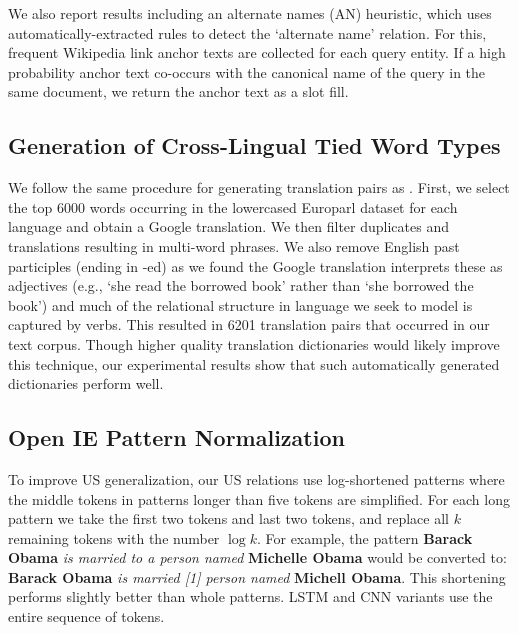 We also report results including an alternate names (AN) heuristic, which uses automatically-extracted rules to detect the `alternate name' relation.
For this, frequent Wikipedia link anchor texts are collected for each query entity.
If a high probability anchor text co-occurs with the canonical name of the query in the same document, we return the anchor text as a slot fill.

\subsection{Generation of Cross-Lingual Tied Word Types}
\label{sec:word-tying}
We follow the same procedure for generating translation pairs as \cite{mikolov2013}. First, we select the top 6000 words occurring in the lowercased Europarl dataset for each language and obtain a Google translation. We then filter duplicates and translations resulting in multi-word phrases. We also remove English past participles (ending in -ed) as we found the Google translation interprets these as adjectives (e.g.,  `she read the borrowed book' rather than `she borrowed the book') and much of the relational structure in language we seek to model is captured by verbs. This resulted in 6201 translation pairs that occurred in our text corpus. Though higher quality translation dictionaries would likely improve this technique, our experimental results show that such automatically generated dictionaries perform well.


\subsection{Open IE Pattern Normalization}
\label{sec:norm}
To improve US generalization, our US relations use log-shortened patterns where the middle tokens in patterns longer than five tokens are simplified. For each long pattern we take the first two tokens and last two tokens, and replace all $k$ remaining tokens with the number $\log k$. For example, the pattern {\bf Barack Obama} {\it is married to a person named} {\bf Michelle Obama} would be converted to: {\bf Barack Obama} {\it is married [1] person named} {\bf Michell Obama}. This shortening performs slightly better than whole patterns. LSTM and CNN variants use the entire sequence of tokens.

